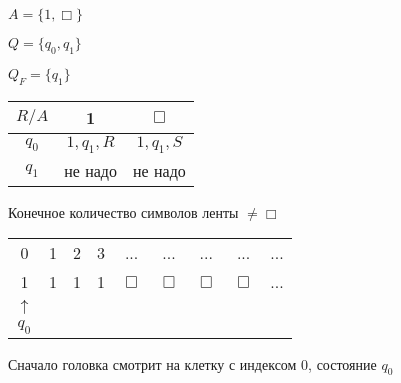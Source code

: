 \documentclass[russian]{lecture-notes}
\begin{document}
    \begin{example}

        $A = \{ 1, \Box \}$

        $Q = \{ q_0, q_1 \}$

        $Q_F = \{ q_1 \}$


        \begin{table}[H]
            \centering
            \begin{tabular}{|c|c|c|}
                \hline
                $R/A$ & 1           & $\Box$      \\ \hline
                $q_0$   & $1, q_1, R$ & $1, q_1, S$ \\ \hline
                $q_1$   & не надо     & не надо     \\ \hline
            \end{tabular}
        \end{table}


        Конечное количество символов ленты $\neq \Box$

        \begin{table}[H]

            \centering
            \begin{tabular}{ *{9}{c} }
                \cline{1-9}
                \multicolumn{1}{|c}{0} &
                \multicolumn{1}{|c}{1} &
                \multicolumn{1}{|c}{2} &
                \multicolumn{1}{|c}{3} &
                \multicolumn{1}{|c}{...} &
                \multicolumn{1}{|c}{...} &
                \multicolumn{1}{|c}{...} &
                \multicolumn{1}{|c}{...} &
                \multicolumn{1}{|c|}{...} \\
                \cline{1-9}
                \cline{1-9}
                \multicolumn{1}{|c}{1} &
                \multicolumn{1}{|c}{1} &
                \multicolumn{1}{|c}{1} &
                \multicolumn{1}{|c}{1} &
                \multicolumn{1}{|c}{$\Box$} &
                \multicolumn{1}{|c}{$\Box$} &
                \multicolumn{1}{|c}{$\Box$} &
                \multicolumn{1}{|c}{$\Box$} &
                \multicolumn{1}{|c|}{...} \\
                \cline{1-9}
                $\uparrow$ \\
                $q_0$
            \end{tabular}
        \end{table}

        Сначало головка смотрит на клетку с индексом 0, состояние $q_0$


\end{example}
\end{document}
